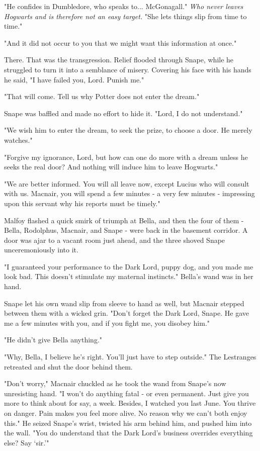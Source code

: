 "He confides in Dumbledore, who speaks to... McGonagall." \emph{Who never leaves Hogwarts and is therefore not an easy target.} "She lets things slip from time to time."

"And it did not occur to you that we might want this information at once."

There. That was the transgression. Relief flooded through Snape, while he struggled to turn it into a semblance of misery. Covering his face with his hands he said, "I have failed you, Lord. Punish me."

"That will come. Tell us why Potter does not enter the dream."

Snape was baffled and made no effort to hide it. "Lord, I do not understand."

"We wish him to enter the dream, to seek the prize, to choose a door. He merely watches."

"Forgive my ignorance, Lord, but how can one do more with a dream unless he seeks the real door? And nothing will induce him to leave Hogwarts."

"We are better informed. You will all leave now, except Lucius who will consult with us. Macnair, you will spend a few minutes - a very few minutes - impressing upon this servant why his reports must be timely."

Malfoy flashed a quick smirk of triumph at Bella, and then the four of them - Bella, Rodolphus, Macnair, and Snape - were back in the basement corridor. A door was ajar to a vacant room just ahead, and the three shoved Snape unceremoniously into it.

"I guaranteed your performance to the Dark Lord, puppy dog, and you made me look bad. This doesn't stimulate my maternal instincts." Bella's wand was in her hand.

Snape let his own wand slip from sleeve to hand as well, but Macnair stepped between them with a wicked grin. "Don't forget the Dark Lord, Snape. He gave me a few minutes with you, and if you fight me, you disobey him."

"He didn't give Bella anything."

"Why, Bella, I believe he's right. You'll just have to step outside." The Lestranges retreated and shut the door behind them.

"Don't worry," Macnair chuckled as he took the wand from Snape's now unresisting hand. "I won't do anything fatal - or even permanent. Just give you more to think about for say, a week. Besides, I watched you last June. You thrive on danger. Pain makes you feel more alive. No reason why we can't both enjoy this." He seized Snape's wrist, twisted his arm behind him, and pushed him into the wall. "You do understand that the Dark Lord's business overrides everything else? Say `sir.'"

